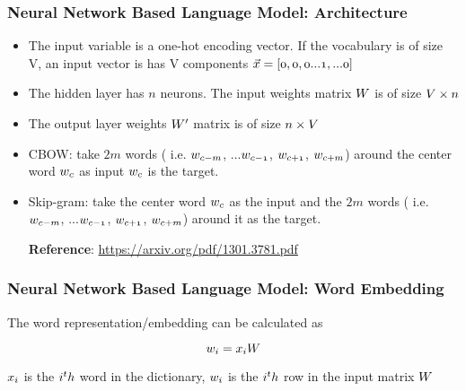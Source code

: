 \documentclass[notheorems, aspectratio=54]{beamer}
\begin{document}
\begin{frame}

\frametitle{ Neural Network Based Language Model: Architecture}

\begin{itemize}

\item The input variable is a one-hot encoding vector. If the vocabulary is of size V, an input vector is has V components $\mathnormal{\vec{x}=[0, 0, 0 ...1, ...0]}$ 
\item The hidden layer has $n$ neurons. The input weights matrix $\mathnormal{W}$ is of size $\mathnormal{V\times n}$
\item The output layer weights $\mathnormal{W}'$ matrix is of size $\mathnormal{n\times V}$
\item CBOW: take $2m$ words ( i.e. $\mathnormal{w_{c-m}}$, ...$\mathnormal{w_{c-1}}$, $\mathnormal{w_{c+1}}$, $\mathnormal{w_{c+m}}$) around the center word $\mathnormal{w_c}$ as input  $\mathnormal{w_c}$ is the target.
\item Skip-gram: take the center word $\mathnormal{w_c}$ as the input and the $2m$ words ( i.e. $\mathnormal{w_{c-m}}$, ...$\mathnormal{w_{c-1}}$, $\mathnormal{w_{c+1}}$, $\mathnormal{w_{c+m}}$) around it as the target.

\textbf{Reference}: \url {https://arxiv.org/pdf/1301.3781.pdf}

\end{itemize}

\end{frame}

\begin{frame}
\frametitle{Neural Network Based Language Model: Word Embedding}

The word representation/embedding can be calculated as 

$$\mathnormal{w_i=x_iW}$$

$\mathnormal{x_i}$ is the $\mathnormal{i^th}$ word in the dictionary, $\mathnormal{w_i}$ is the $\mathnormal{i^th}$ row in the input matrix $\mathnormal{W}$

\end{frame}
\end{document}
